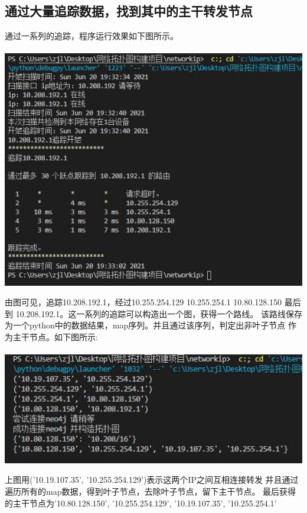 \documentclass{article} %
\begin{document}
        \subsection{\Large 通过大量追踪数据，找到其中的主干转发节点}
        \par 通过一系列的追踪，程序运行效果如下图所示。\\
        \\
        \includegraphics[scale=0.8]{pic/追踪结果1.JPG}
        \par 由图可见，追踪10.208.192.1，经过10.255.254.129  10.255.254.1  10.80.128.150 最后到
        10.208.192.1。这一系列的追踪可以构造出一个图，获得一个路线。
        该路线保存为一个python中的数据结果，map序列。并且通过该序列，判定出非叶子节点
        作为主干节点。如下图所示:\\
        \\
        \includegraphics[scale=0.8]{pic/追踪结果2.JPG}
        \par 上图用('10.19.107.35', '10.255.254.129')表示这两个IP之间互相连接转发
        并且通过遍历所有的map数据，得到叶子节点，去除叶子节点，留下主干节点。
        最后获得的主干节点为{'10.80.128.150', '10.255.254.129', '10.19.107.35', '10.255.254.1'}
\end{document}
